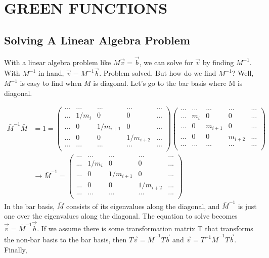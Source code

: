 \documentclass[12pt]{article}
\begin{document}
\section{GREEN FUNCTIONS}
\subsection{Solving A Linear Algebra Problem}
With a linear algebra problem like $M\vec{v} = \vec{b}$, we can solve for $\vec{v}$ by finding $M^{-1}$. With $M^{-1}$ in hand, $\vec{v} = M^{-1}\vec{b}$. Problem solved. But how do we find $M^{-1}$? Well, $M^{-1}$ is easy to find when $M$ is diagonal. Let's go to the bar basis where M is diagonal.

\begin{equation}
\label{minv}
\begin{split}
\bar{M}^{-1}\bar{M} &= 1 = 
\begin{pmatrix}
... & ... & ... & ... & ... \\
... & 1/m_i & 0 & 0 & ... \\
... & 0 & 1/m_{i+1} & 0 & ... \\
... & 0 & 0 & 1/m_{i+2} & ... \\
... & ... & ... & ... & ... \\
\end{pmatrix}
\begin{pmatrix}
... & ... & ... & ... & ... \\
... & m_i & 0 & 0 & ... \\
... & 0 & m_{i+1} & 0 & ... \\
... & 0 & 0 & m_{i+2} & ... \\
... & ... & ... & ... & ... \\
\end{pmatrix} \\
&\rightarrow \bar{M}^{-1} =  
\begin{pmatrix}
... & ... & ... & ... & ... \\
... & 1/m_i & 0 & 0 & ... \\
... & 0 & 1/m_{i+1} & 0 & ... \\
... & 0 & 0 & 1/m_{i+2} & ... \\
... & ... & ... & ... & ... \\
\end{pmatrix}
\end{split}
\end{equation}
In the bar basis, $\bar{M}$ consists of its eigenvalues along the diagonal, and $\bar{M}^{-1}$ is just one over the eigenvalues along the diagonal. The equation to solve becomes $\vec{\bar{v}} = \bar{M}^{-1}\vec{\bar{b}}$. If we assume there is some transformation matrix T that transforms the non-bar basis to the bar basis, then $T\vec{v} = \bar{M}^{-1}T\vec{b}$ and $\vec{v} = T^{-1}\bar{M}^{-1}T\vec{b}$. Finally, 
\end{document}
